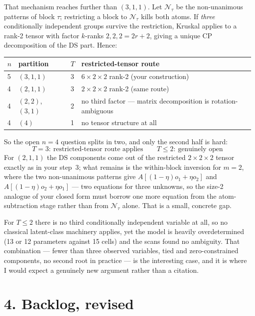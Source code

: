 \documentclass[11pt]{article}
\theoremstyle{remark}
\newcommand{\N}{\mathcal{N}}
\begin{document}
That mechanism reaches further than $(3,1,1)$. Let $\N_\tau$ be the non-unanimous patterns of block $\tau$; restricting a block to $\N_\tau$ kills both atoms. If \emph{three} conditionally independent groups survive the restriction, Kruskal applies to a rank-2 tensor with factor $k$-ranks $2,2,2=2r+2$, giving a unique CP decomposition of the DS part. Hence:

\begin{center}\small
\begin{tabular}{@{}llll@{}}
\toprule
$n$ & partition & $T$ & restricted-tensor route\\
\midrule
5 & $(3,1,1)$ & 3 & $6\times2\times2$ rank-2 \quad(your construction)\\
4 & $(2,1,1)$ & 3 & $2\times2\times2$ rank-2 \quad(same route)\\
4 & $(2,2)$, $(3,1)$ & 2 & no third factor --- matrix decomposition is rotation-ambiguous\\
4 & $(4)$ & 1 & no tensor structure at all\\
\bottomrule
\end{tabular}
\end{center}

So the open $n=4$ question splits in two, and only the second half is hard:
\[
\boxed{\;T=3:\ \text{restricted-tensor route applies}\qquad
T\le2:\ \text{genuinely open}\;}
\]
For $(2,1,1)$ the DS components come out of the restricted $2\times2\times2$ tensor exactly as in your step~3; what remains is the within-block inversion for $m=2$, where the two non-unanimous patterns give $A[(1-\eta)o_1+\eta o_2]$ and $A[(1-\eta)o_2+\eta o_1]$ --- two equations for three unknowns, so the size-2 analogue of your closed form must borrow one more equation from the atom-subtraction stage rather than from $\N_\tau$ alone. That is a small, concrete gap.

For $T\le2$ there is no third conditionally independent variable at all, so no classical latent-class machinery applies, yet the model is heavily overdetermined (13 or 12 parameters against 15 cells) and the scans found no ambiguity. That combination --- fewer than three observed variables, tied and zero-constrained components, no second root in practice --- is the interesting case, and it is where I would expect a genuinely new argument rather than a citation.

\section*{4. Backlog, revised}
\end{document}

